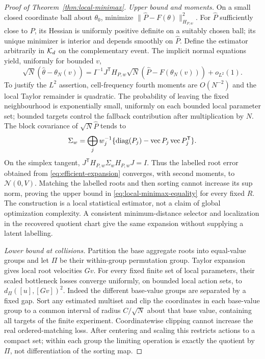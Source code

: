\begin{proof}[Proof of Theorem~\ref{thm:local-minimax}]
\emph{Upper bound and moments.} On a small closed coordinate ball about
$\theta_0$, minimize $\|\widehat P-F(\theta)\|_{H_{P,w}}^2$.
For $\widehat P$ sufficiently close to $P$, its Hessian is uniformly
positive definite on a suitably chosen ball; its unique minimizer is
interior and depends smoothly on $\widehat P$. Define the estimator
arbitrarily in $\mathcal K_d$ on the complementary event. The implicit
normal equations yield, uniformly for bounded $v$,
\begin{equation}\label{eq:efficient-expansion}
 \sqrt N(\widehat\theta-\theta_N(v))
   =I^{-1}J^{\mathsf T}H_{P,w}\sqrt N
                       (\widehat P-F(\theta_N(v)))+o_{L^2}(1).
\end{equation}
To justify the $L^2$ assertion, cell-frequency fourth moments are
$O(N^{-2})$ and the local Taylor remainder is quadratic. The probability
of leaving the fixed neighbourhood is exponentially small, uniformly
on each bounded local parameter set; bounded targets control the
fallback contribution after multiplication by $N$.
The block covariance of $\sqrt N\widehat P$ tends to
\[
 \Sigma_w=\bigoplus_jw_j^{-1}
                    \{\operatorname{diag}(P_j)-\operatorname{vec}P_j\operatorname{vec}P_j^{\mathsf T}\}.
\]
On the simplex tangent, $J^{\mathsf T}H_{P,w}\Sigma_wH_{P,w}J=I$.
Thus the labelled root error obtained from \eqref{eq:efficient-expansion}
converges, with second moments, to $\mathcal N(0,V)$. Matching the
labelled roots and then sorting cannot increase its sup norm, proving
the upper bound in \eqref{eq:local-minimax-equality} for every fixed
$R$. The construction is a local statistical estimator, not a claim of
global optimization complexity. A consistent minimum-distance selector
and localization in the recovered quotient chart give the same
expansion without supplying a latent labelling.

\emph{Lower bound at collisions.} Partition the base aggregate roots
into equal-value groups and let $\Pi$ be their within-group permutation
group. Taylor expansion gives local root velocities $Gv$. For every
fixed finite set of local parameters, their scaled bottleneck losses
converge uniformly, on bounded local action sets, to
$d_\Pi([u],[Gv])^2$. Indeed the different base-value groups are separated
by a fixed gap. Sort any estimated multiset and clip the coordinates
in each base-value group to a common interval of radius $C/\sqrt N$
about that base value, containing all targets of the finite experiment.
Coordinatewise clipping cannot increase the real ordered-matching loss.
After centering and scaling this restricts actions to a compact set;
within each group the limiting operation is exactly the quotient by
$\Pi$, not differentiation of the sorting map.


\end{proof}
